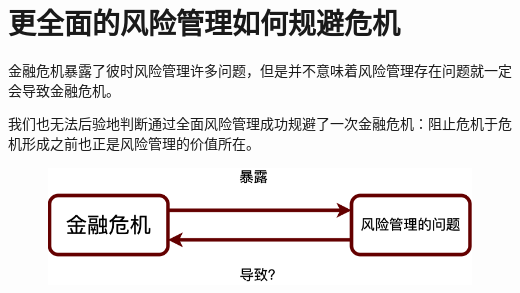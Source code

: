 \section{更全面的风险管理如何规避危机}
\begin{frame}
    金融危机暴露了彼时风险管理许多问题，但是并不意味着风险管理存在问题就一定会导致金融危机。
    
    我们也无法后验地判断通过全面风险管理成功规避了一次金融危机：阻止危机于危机形成之前也正是风险管理的价值所在。
    \begin{figure}
        \centering
        \includegraphics[width=0.8\linewidth]{img/luna.drawio.png}
    \end{figure}
\end{frame}

